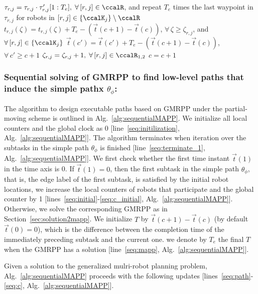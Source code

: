 \documentclass[Afour,sageh,times]{sagej}
\begin{document}
{{{\begin{algorithm}[!t]
{{            $\tau_{r,j} = \tau_{r,j} \cdot \tau'_{r,j}[1:T_e], \;\forall \,[r,j] \in \ccalR $, and repeat  $T_e$ times  the last waypoint in $\tau_{r,j}$ for robots in $[r,j] \in \{\ccalK_j\} \setminus \ccalR$ \label{seq:path}\;
            $t_{r,j}(\zeta) =  t_{r,j}(\zeta)  + T_e - (\vec{t}(c+1) - \vec{t}(c))$, $\forall \,\zeta \geq  \zeta_{r,j}$, and $ \forall\, [r,j] \in \{\ccalK_j\} $ \label{seq:timeline} \;
            $\vec{t}(c') = \vec{t}(c') + T_e - (\vec{t}(c+1) - \vec{t}(c))$, $ \forall \, c' \geq c+1$  \label{seq:axis}\;
            $\zeta_{r,j} = \zeta_{r,j} + 1, \; \forall \, [r,j] \in \ccalR_{1,2}$ \label{seq:counter}\;
            $c = c + 1$ \label{seq:c}\;

        }
      }
\end{algorithm}}

 \subsubsection{Sequential solving of  GMRPP to find low-level paths that induce the simple pathx $\theta_{\phi}$:}
 The algorithm to design executable paths based on GMRPP under the  partial-moving scheme is outlined in Alg.~\ref{alg:sequentialMAPP}.  We initialize all local counters and the global clock as 0 [line~\ref{seq:initilization}, Alg.~\ref{alg:sequentialMAPP}]. The algorithm  terminates when iteration over  the subtasks in the simple path $\theta_{\phi}$ is finished [line~\ref{seq:terminate_1}, Alg.~\ref{alg:sequentialMAPP}].  We first check whether the first time instant $\vec{t}(1)$ in the time axis is 0. If $\vec{t}(1)=0$, then the first subtask in the simple path $\theta_{\phi}$, that is, the edge label of the first subtask, is satisfied by the initial robot locations, we increase the local counters of robots that participate and the global counter by 1 [lines~\ref{seq:initial}-\ref{seq:c_initial}, Alg.~\ref{alg:sequentialMAPP}]. Otherwise, we solve the corresponding GMRPP as in Section~\ref{sec:solution2mapp}.  We initialize $T$ by $\vec{t}(c+1) - \vec{t}(c)$ (by default $\vec{t}(0)=0$),  which is the difference between the completion time of the immediately preceding subtask and the current one. %
we denote by $T_e$  the final $T$  when  the GMRPP has a solution [line~\ref{seq:mapp}, Alg.~\ref{alg:sequentialMAPP}]. {Given a solution to the generalized mulri-robot planning problem, Alg.~\ref{alg:sequentialMAPP} proceeds with the following updates [lines~\ref{seq:path}-\ref{seq:c}, Alg.~\ref{alg:sequentialMAPP}].

}}}
\end{document}
